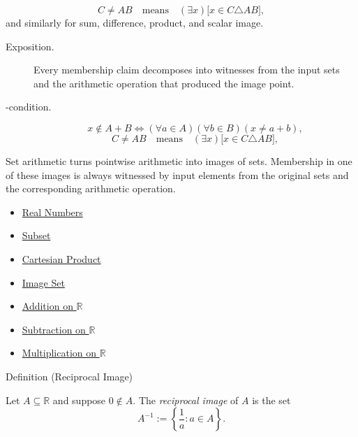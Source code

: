 \begin{remark*}
\[
C\ne AB
\quad\text{means}\quad
(\exists x)\bigl[x\in C\triangle AB\bigr],
\]
and similarly for sum, difference, product, and scalar image.
\end{remark*}

\begin{remark*}
\begin{description}
  \item[Exposition.]
Every membership claim decomposes into witnesses from the input sets and the
arithmetic operation that produced the image point.


  \item[\exists-condition.]
  \[
x\notin A+B\Longleftrightarrow(\forall a\in A)(\forall b\in B)(x\neq a+b),
\]
\[
C\ne AB
\quad\text{means}\quad
(\exists x)\bigl[x\in C\triangle AB\bigr],
\]
\end{description}
\end{remark*}

\begin{remark*}[Interpretation]
Set arithmetic turns pointwise arithmetic into images of sets. Membership in
one of these images is always witnessed by input elements from the original
sets and the corresponding arithmetic operation.
\end{remark*}

\begin{dependencies}
\begin{itemize}
  \item \hyperref[def:reals]{Real Numbers}
  \item \hyperref[def:subset]{Subset}
  \item \hyperref[def:cartesian-product]{Cartesian Product}
  \item \hyperref[def:image-set]{Image Set}
  \item \hyperref[def:addition-on-r]{Addition on $\mathbb{R}$}
  \item \hyperref[def:subtraction-on-r]{Subtraction on $\mathbb{R}$}
  \item \hyperref[def:multiplication-on-r]{Multiplication on $\mathbb{R}$}
\end{itemize}
\end{dependencies}

\begin{definitionbox}{Definition (Reciprocal Image)}
\begin{definition}
\label{def:reciprocal-image}
Let $A\subseteq\mathbb{R}$ and suppose $0\notin A$.  The \emph{reciprocal
image} of $A$ is the set
\[
  A^{-1}:=\left\{\frac{1}{a}:a\in A\right\}.
\]
\end{definition}
\end{definitionbox}

